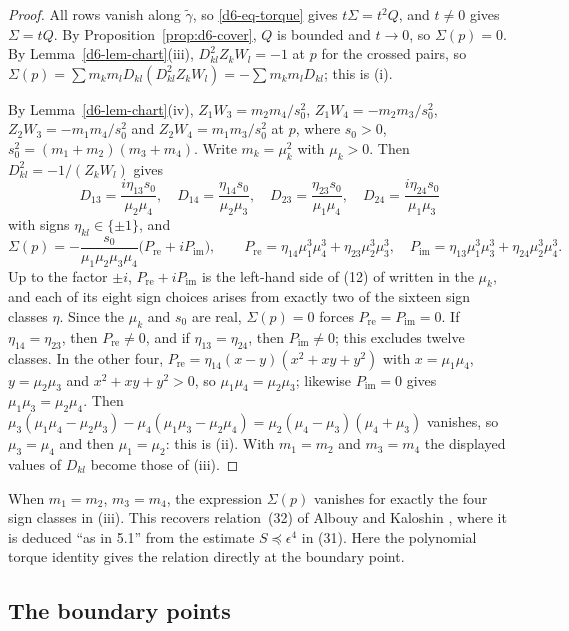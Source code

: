 \documentclass[11pt]{amsart}
\theoremstyle{definition}
\theoremstyle{remark}
\begin{document}
\begin{proof}
All rows vanish along $\tilde\gamma$, so \eqref{d6-eq-torque} gives $t\Sigma=t^2Q$, and $t\ne0$
gives $\Sigma=tQ$.  By Proposition~\ref{prop:d6-cover}, $Q$ is bounded and $t\to0$, so
$\Sigma(p)=0$.  By Lemma~\ref{d6-lem-chart}(iii), $D_{kl}^2Z_kW_l=-1$ at $p$ for the crossed
pairs, so $\Sigma(p)=\sum m_km_lD_{kl}(D_{kl}^2Z_kW_l)=-\sum m_km_lD_{kl}$; this is (i).

By Lemma~\ref{d6-lem-chart}(iv), $Z_1W_3=m_2m_4/s_0^2$, $Z_1W_4=-m_2m_3/s_0^2$,
$Z_2W_3=-m_1m_4/s_0^2$ and $Z_2W_4=m_1m_3/s_0^2$ at $p$, where $s_0>0$,
$s_0^2=(m_1+m_2)(m_3+m_4)$.  Write $m_k=\mu_k^2$ with $\mu_k>0$.  Then $D_{kl}^2=-1/(Z_kW_l)$ gives
\[
  D_{13}=\frac{i\eta_{13}s_0}{\mu_2\mu_4},\quad D_{14}=\frac{\eta_{14}s_0}{\mu_2\mu_3},\quad
  D_{23}=\frac{\eta_{23}s_0}{\mu_1\mu_4},\quad D_{24}=\frac{i\eta_{24}s_0}{\mu_1\mu_3}
\]
with signs $\eta_{kl}\in\{\pm1\}$, and
\[
  \Sigma(p)=-\frac{s_0}{\mu_1\mu_2\mu_3\mu_4}\bigl(P_{\mathrm{re}}+iP_{\mathrm{im}}\bigr),\qquad
  P_{\mathrm{re}}=\eta_{14}\mu_1^3\mu_4^3+\eta_{23}\mu_2^3\mu_3^3,\quad
  P_{\mathrm{im}}=\eta_{13}\mu_1^3\mu_3^3+\eta_{24}\mu_2^3\mu_4^3.
\]
Up to the factor $\pm i$, $P_{\mathrm{re}}+iP_{\mathrm{im}}$ is the left-hand side of (12) of
\cite[\S5.1]{AK} written in the $\mu_k$, and each of its eight sign choices arises from exactly two
of the sixteen sign classes $\eta$.
Since the $\mu_k$ and $s_0$ are real, $\Sigma(p)=0$ forces $P_{\mathrm{re}}=P_{\mathrm{im}}=0$.  If
$\eta_{14}=\eta_{23}$, then $P_{\mathrm{re}}\ne0$, and if $\eta_{13}=\eta_{24}$, then
$P_{\mathrm{im}}\ne0$; this excludes twelve classes.  In the other four,
$P_{\mathrm{re}}=\eta_{14}(x-y)(x^2+xy+y^2)$ with $x=\mu_1\mu_4$, $y=\mu_2\mu_3$ and
$x^2+xy+y^2>0$, so $\mu_1\mu_4=\mu_2\mu_3$; likewise $P_{\mathrm{im}}=0$ gives
$\mu_1\mu_3=\mu_2\mu_4$.  Then
$\mu_3(\mu_1\mu_4-\mu_2\mu_3)-\mu_4(\mu_1\mu_3-\mu_2\mu_4)=\mu_2(\mu_4-\mu_3)(\mu_4+\mu_3)$
vanishes, so $\mu_3=\mu_4$ and then $\mu_1=\mu_2$: this is (ii).  With $m_1=m_2$ and $m_3=m_4$
the displayed values of $D_{kl}$ become those of (iii).
\end{proof}
{
When $m_1=m_2$, $m_3=m_4$, the expression $\Sigma(p)$ vanishes for exactly
the four sign classes in (iii).  This recovers relation~(32) of
Albouy and Kaloshin \cite[\S8.6]{AK}, where it is deduced ``as in 5.1''
from the estimate $S\preccurlyeq\epsilon^4$ in (31).  Here the polynomial
torque identity gives the relation directly at the boundary point.
}

\subsection{The boundary points}
\end{document}
